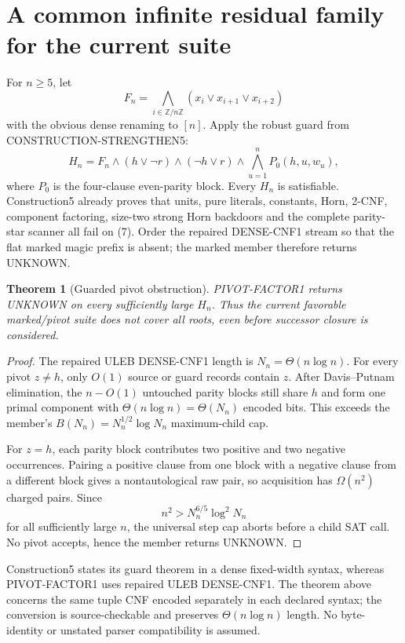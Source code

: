 \documentclass[11pt]{article}
\newtheorem{theorem}{Theorem}
\begin{document}
\section{A common infinite residual family for the current suite}

For $n\ge5$, let
\[
 F_n=\bigwedge_{i\in\mathbb Z/n\mathbb Z}
       (x_i\vee x_{i+1}\vee x_{i+2})                       \tag{6}
\]
with the obvious dense renaming to $[n]$.  Apply the robust guard from
CONSTRUCTION-STRENGTHEN5:
\[
 H_n=F_n\wedge(h\vee\neg r)\wedge(\neg h\vee r)
       \wedge\bigwedge_{u=1}^n P_0(h,u,w_u),               \tag{7}
\]
where $P_0$ is the four-clause even-parity block.  Every $H_n$ is satisfiable.
Construction5 already proves that units, pure literals, constants, Horn,
2-CNF, component factoring, size-two strong Horn backdoors and the complete
parity-star scanner all fail on (7).  Order the repaired DENSE-CNF1 stream so
that the flat marked magic prefix is absent; the marked member therefore
returns UNKNOWN.

\begin{theorem}[Guarded pivot obstruction]\label{thm:guard}
PIVOT-FACTOR1 returns UNKNOWN on every sufficiently large $H_n$.  Thus the
current favorable marked/pivot suite does not cover all roots, even before
successor closure is considered.
\end{theorem}
\begin{proof}
The repaired ULEB DENSE-CNF1 length is $N_n=\Theta(n\log n)$.  For every
pivot $z\ne h$, only $O(1)$ source or guard records contain $z$.  After
Davis--Putnam elimination, the $n-O(1)$ untouched parity blocks still share
$h$ and form one primal component with $\Theta(n\log n)=\Theta(N_n)$ encoded
bits.  This exceeds the member's
$B(N_n)=N_n^{1/2}\log N_n$ maximum-child cap.

For $z=h$, each parity block contributes two positive and two negative
occurrences.  Pairing a positive clause from one block with a negative clause
from a different block gives a nontautological raw pair, so acquisition has
$\Omega(n^2)$ charged pairs.  Since
\[
 n^2>N_n^{6/5}\log^2N_n
\]
for all sufficiently large $n$, the universal step cap aborts before a child
SAT call.  No pivot accepts, hence the member returns UNKNOWN.
\end{proof}

Construction5 states its guard theorem in a dense fixed-width syntax, whereas
PIVOT-FACTOR1 uses repaired ULEB DENSE-CNF1.  The theorem above concerns the
same tuple CNF encoded separately in each declared syntax; the conversion is
source-checkable and preserves $\Theta(n\log n)$ length.  No byte-identity or
unstated parser compatibility is assumed.
\end{document}

